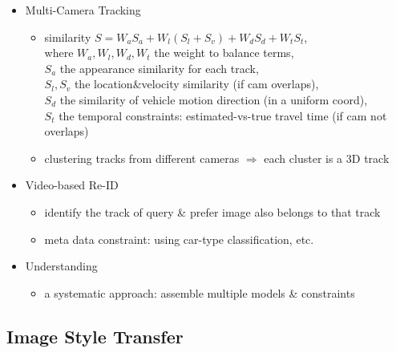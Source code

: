 \begin{itemize}
\begin{itemize}
\begin{itemize}
		\end{itemize}
	\item Multi-Camera Tracking
		\begin{itemize}
		\item similarity $S=W_aS_a + W_l(S_l+S_v) + W_dS_d + W_tS_t$, \\ 
		where $W_a, W_l, W_d, W_t$ the weight to balance terms, \\
		$S_a$ the appearance similarity for each track, \\
		$S_l, S_v$ the location\&velocity similarity (if cam overlaps), \\
		$S_d$ the similarity of vehicle motion direction (in a uniform coord), \\
		$S_t$ the temporal constraints: estimated-vs-true travel time (if cam not overlaps)
		\item clustering tracks from different cameras $\Rightarrow$ each cluster is a 3D track
		\end{itemize}
	\item Video-based Re-ID
		\begin{itemize}
		\item identify the track of query \& prefer image also belongs to that track
		\item meta data constraint: using car-type classification, etc.
		\end{itemize}
	\item Understanding
		\begin{itemize}
		\item a systematic approach: assemble multiple models \& constraints
		\end{itemize}
	\end{itemize}
\end{itemize}

\subsection{Image Style Transfer}
